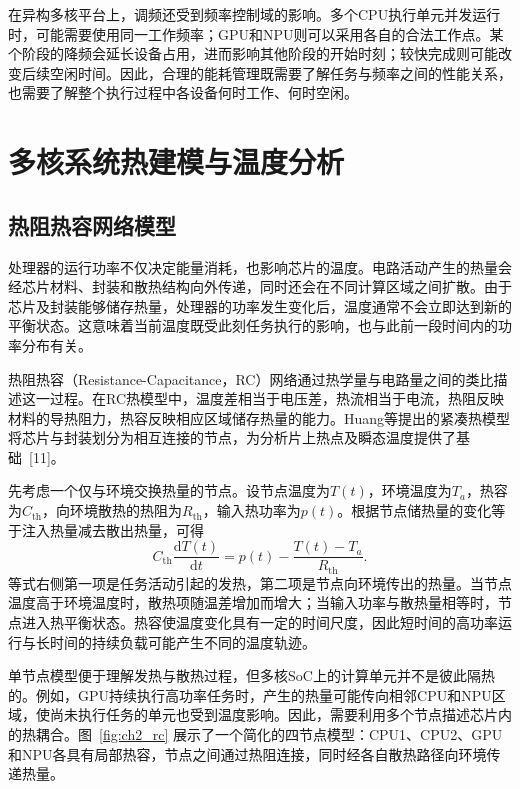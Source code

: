 在异构多核平台上，调频还受到频率控制域的影响。多个CPU执行单元并发运行时，可能需要使用同一工作频率；GPU和NPU则可以采用各自的合法工作点。某个阶段的降频会延长设备占用，进而影响其他阶段的开始时刻；较快完成则可能改变后续空闲时间。因此，合理的能耗管理既需要了解任务与频率之间的性能关系，也需要了解整个执行过程中各设备何时工作、何时空闲。

\section{多核系统热建模与温度分析}

\subsection{热阻热容网络模型}

处理器的运行功率不仅决定能量消耗，也影响芯片的温度。电路活动产生的热量会经芯片材料、封装和散热结构向外传递，同时还会在不同计算区域之间扩散。由于芯片及封装能够储存热量，处理器的功率发生变化后，温度通常不会立即达到新的平衡状态。这意味着当前温度既受此刻任务执行的影响，也与此前一段时间内的功率分布有关。

热阻热容（Resistance-Capacitance，RC）网络通过热学量与电路量之间的类比描述这一过程。在RC热模型中，温度差相当于电压差，热流相当于电流，热阻反映材料的导热阻力，热容反映相应区域储存热量的能力。Huang等提出的紧凑热模型将芯片与封装划分为相互连接的节点，为分析片上热点及瞬态温度提供了基础~[11]。

先考虑一个仅与环境交换热量的节点。设节点温度为$T(t)$，环境温度为$T_a$，热容为$C_{\mathrm{th}}$，向环境散热的热阻为$R_{\mathrm{th}}$，输入热功率为$p(t)$。根据节点储热量的变化等于注入热量减去散出热量，可得
\begin{equation}\label{eq:ch2-rc-one}
 C_{\mathrm{th}}\frac{\mathrm{d}T(t)}{\mathrm{d}t}
 =p(t)-\frac{T(t)-T_a}{R_{\mathrm{th}}}.
\end{equation}
等式右侧第一项是任务活动引起的发热，第二项是节点向环境传出的热量。当节点温度高于环境温度时，散热项随温差增加而增大；当输入功率与散热量相等时，节点进入热平衡状态。热容使温度变化具有一定的时间尺度，因此短时间的高功率运行与长时间的持续负载可能产生不同的温度轨迹。

单节点模型便于理解发热与散热过程，但多核SoC上的计算单元并不是彼此隔热的。例如，GPU持续执行高功率任务时，产生的热量可能传向相邻CPU和NPU区域，使尚未执行任务的单元也受到温度影响。因此，需要利用多个节点描述芯片内的热耦合。图~\ref{fig:ch2_rc} 展示了一个简化的四节点模型：CPU1、CPU2、GPU和NPU各具有局部热容，节点之间通过热阻连接，同时经各自散热路径向环境传递热量。

